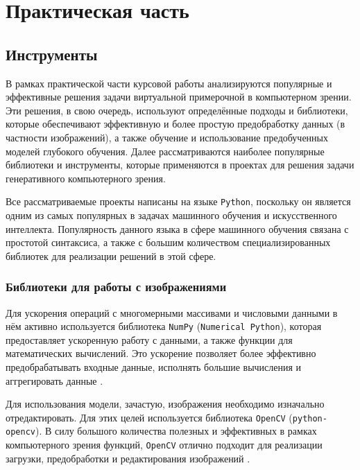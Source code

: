 \section{Практическая часть}
\subsection{Инструменты}
В рамках практической части курсовой работы анализируются популярные и эффективные решения задачи виртуальной примерочной в компьютерном зрении. Эти решения, в свою очередь, используют определённые подходы и библиотеки, которые обеспечивают эффективную и более простую предобработку данных (в частности изображений), а также обучение и использование предобученных моделей глубокого обучения. Далее рассматриваются наиболее популярные библиотеки и инструменты, которые применяются в проектах для решения задачи генеративного компьютерного зрения.

Все рассматриваемые проекты написаны на языке \texttt{Python}, поскольку он является одним из самых популярных в задачах машинного обучения и искусственного интеллекта. Популярность данного языка в сфере машинного обучения связана с простотой синтаксиса, а также с большим количеством специализированных библиотек для реализации решений в этой сфере. 

\subsubsection{Библиотеки для работы с изображениями}
Для ускорения операций с многомерными массивами и числовыми данными в нём активно используется библиотека \texttt{NumPy} (\texttt{Numerical Python}), которая предоставляет ускоренную работу с данными, а также функции для математических вычислений. Это ускорение позволяет более эффективно предобрабатывать входные данные, исполнять большие вычисления и аггрегировать данные \cite{numpy}.

Для использования модели, зачастую, изображения необходимо изначально отредактировать. Для этих целей используется библиотека \texttt{OpenCV} (\texttt{python-opencv}). В силу большого количества полезных и эффективных в рамках компьютерного зрения функций, \texttt{OpenCV} отлично подходит для реализации загрузки, предобработки и редактирования изображений \cite{opencv}.

